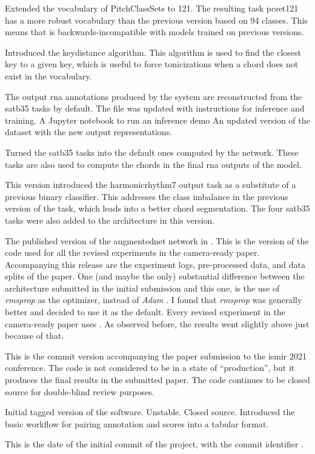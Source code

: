 Extended the vocabulary of PitchClassSets to 121. The
resulting task \gls{pcset121} has a more robust vocabulary
than the previous version based on 94 classes. This means
that  is backwards-incompatible with models
trained on previous versions.


Introduced the keydistance algorithm. This algorithm is used
to find the closest key to a given key, which is useful to
force tonicizations when a chord does not exist in the
vocabulary.

The output \gls{rna} annotations produced by the system are
reconstructed from the \gls{satb35} tasks by default. The
 file was updated with instructions for
inference and training. A Jupyter notebook
\textcite{kluyver2016jupyter} to run an inference demo An
updated version of the dataset with the new output
representations.

Turned the \gls{satb35} tasks into the default ones computed
by the network. These tasks are also used to compute the
chords in the final \gls{rna} outputs of the model.

This version introduced the \gls{harmonicrhythm7} output
task as a substitute of a previous binary classifier. This
addresses the class imbalance in the previous version of the
task, which leads into a better chord segmentation. The four
\gls{satb35} tasks were also added to the architecture in
this version. 

The published version of the \gls{augmentednet} network in
\textcite{napoleslopez2021augmentednet}. This is the version
of the code used for all the revised experiments in the
camera-ready paper. Accompanying this release are the
experiment logs, pre-processed data, and data splits of the
paper. One (and maybe the only) substantial difference
between the architecture submitted in the initial submission
and this one, is the use of \emph{rmsprop} as the optimizer,
instead of \emph{Adam} \parencite{kingma2014adam}. I found
that \emph{rmsprop} was generally better and decided to use
it as the default. Every revised experiment in the
camera-ready paper uses . As observed before,
the results went slightly above just because of that.

This is the commit version accompanying the paper submission
to the \gls{ismir} 2021 conference. The code is not
considered to be in a state of ``production'', but it
produces the final results in the submitted paper. The code
continues to be closed source for double-blind review
purposes.

Initial tagged version of the software. Unstable. Closed
source. Introduced the basic workflow for pairing annotation
and scores into a tabular format.


This is the date of the initial commit of the project, with
the commit identifier .
    


